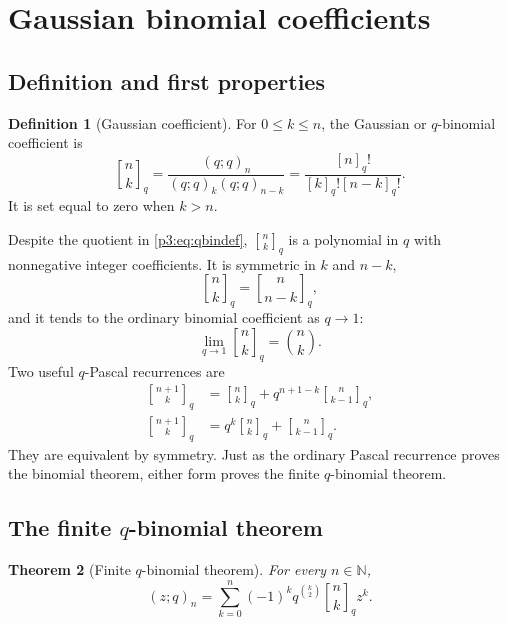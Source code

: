 \documentclass[11pt,oneside]{article}
\newtheorem{theorem}{Theorem}[section]
\theoremstyle{definition}
\newtheorem{definition}[theorem]{Definition}
\theoremstyle{remark}
\newcommand{\qpoch}[3]{\left(#1;#2\right)_{#3}}
\newcommand{\qbinom}[3]{{\genfrac{[}{]}{0pt}{}{#1}{#2}}_{#3}}
\newcommand{\N}{\mathbb N}
\begin{document}
\section{Gaussian binomial coefficients}

\subsection{Definition and first properties}

\begin{definition}[Gaussian coefficient]
For $0\le k\le n$, the Gaussian or $q$-binomial coefficient is
\begin{equation}\label{p3:eq:qbindef}
 \qbinom{n}{k}{q}
 =\frac{\qpoch{q}{q}{n}}
        {\qpoch{q}{q}{k}\qpoch{q}{q}{n-k}}
 =\frac{[n]_q!}{[k]_q![n-k]_q!}.
\end{equation}
It is set equal to zero when $k>n$.
\end{definition}

Despite the quotient in \eqref{p3:eq:qbindef}, $\qbinom{n}{k}{q}$ is a polynomial in $q$ with nonnegative integer coefficients.  It is symmetric in $k$ and $n-k$,
\begin{equation}\label{p3:eq:qbinsymm}
 \qbinom{n}{k}{q}=\qbinom{n}{n-k}{q},
\end{equation}
and it tends to the ordinary binomial coefficient as $q\to1$:
\begin{equation}\label{p3:eq:qbinlimit}
 \lim_{q\to1}\qbinom{n}{k}{q}=\binom nk.
\end{equation}
Two useful $q$-Pascal recurrences are
\begin{align}
 \qbinom{n+1}{k}{q}
 &=\qbinom{n}{k}{q}+q^{n+1-k}\qbinom{n}{k-1}{q},\label{p3:eq:qpascal1}\\
 \qbinom{n+1}{k}{q}
 &=q^k\qbinom{n}{k}{q}+\qbinom{n}{k-1}{q}.
 \label{p3:eq:qpascal2}
\end{align}
They are equivalent by symmetry.  Just as the ordinary Pascal recurrence proves the binomial theorem, either form proves the finite $q$-binomial theorem.

\subsection{The finite \texorpdfstring{$q$-binomial theorem}{q-binomial theorem}}

\begin{theorem}[Finite $q$-binomial theorem]\label{p3:thm:finiteqbinomial}
For every $n\in\N$,
\begin{equation}\label{p3:eq:finiteqbinomial}
 \boxed{
 \qpoch{z}{q}{n}
 =\sum_{k=0}^{n}(-1)^kq^{\binom{k}{2}}
   \qbinom{n}{k}{q}z^k.}
\end{equation}
\end{theorem}
\end{document}
